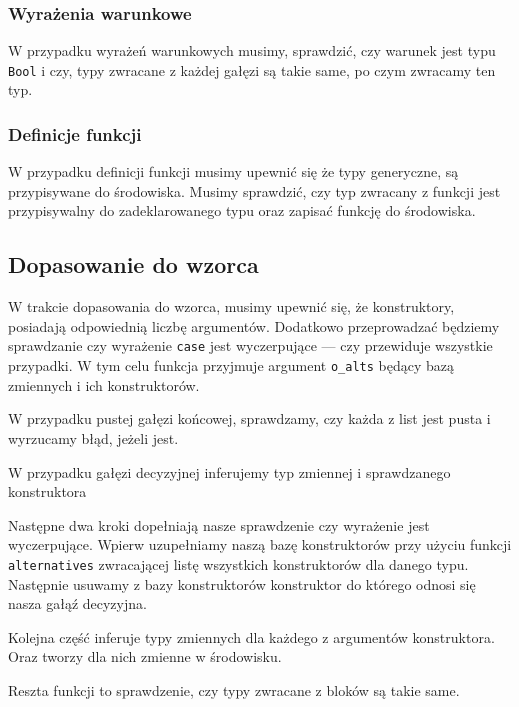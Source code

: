 \documentclass{article}
\begin{document}
\subsubsection{Wyrażenia warunkowe}
W przypadku wyrażeń warunkowych musimy, sprawdzić, czy warunek jest typu \lstinline{Bool} i czy, typy zwracane z każdej gałęzi są takie same, po czym zwracamy ten typ.


\subsubsection{Definicje funkcji}
W przypadku definicji funkcji musimy upewnić się że typy generyczne, są przypisywane do środowiska. Musimy sprawdzić, czy typ zwracany z funkcji jest przypisywalny do zadeklarowanego typu oraz zapisać funkcję do środowiska.


\subsection{Dopasowanie do wzorca}
W trakcie dopasowania do wzorca, musimy upewnić się, że konstruktory, posiadają odpowiednią liczbę argumentów. Dodatkowo przeprowadzać będziemy sprawdzanie czy wyrażenie \lstinline$case$ jest wyczerpujące --- czy przewiduje wszystkie przypadki. W tym celu funkcja przyjmuje argument \lstinline$o_alts$ będący bazą zmiennych i ich konstruktorów.

W przypadku pustej gałęzi końcowej, sprawdzamy, czy każda z list jest pusta i wyrzucamy błąd, jeżeli jest.


W przypadku gałęzi decyzyjnej inferujemy typ zmiennej i sprawdzanego konstruktora

Następne dwa kroki dopełniają nasze sprawdzenie czy wyrażenie jest wyczerpujące. Wpierw uzupełniamy naszą bazę konstruktorów przy użyciu funkcji \lstinline{alternatives} zwracającej listę wszystkich konstruktorów dla danego typu.
Następnie usuwamy z bazy konstruktorów konstruktor do którego odnosi się nasza gałąź decyzyjna.


Kolejna część inferuje typy zmiennych dla każdego z argumentów konstruktora.
Oraz tworzy dla nich zmienne w środowisku.\newpage

Reszta funkcji to sprawdzenie, czy typy zwracane z bloków są takie same.

\end{document}
